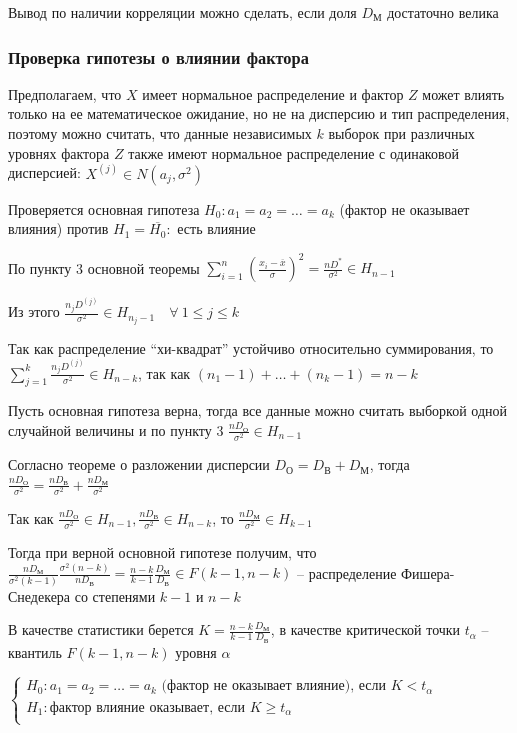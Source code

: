 Вывод по наличии корреляции можно сделать, если доля $D_\text{М}$ достаточно велика

\hypertarget{factor_influence_hypothesis}{}

\subsubsection{Проверка гипотезы о влиянии фактора}

Предполагаем, что $X$ имеет нормальное распределение и фактор $Z$ может влиять только на ее математическое ожидание, 
но не на дисперсию и тип распределения, поэтому можно считать, что данные независимых $k$ выборок при различных уровнях фактора $Z$
также имеют нормальное распределение с одинаковой дисперсией: $X^{(j)} \in N(a_j, \sigma^2)$

Проверяется основная гипотеза $H_0 : a_1 = a_2 = \dots = a_k$ (фактор не оказывает влияния) против $H_1 = \overline{H_0} : $ есть влияние

По пункту 3 основной теоремы $\sum_{i = 1}^n \left(\frac{x_i - \overline{x}}{\sigma}\right)^2 = \frac{n D^*}{\sigma^2} \in H_{n - 1}$

Из этого $\frac{n_j D^{(j)}}{\sigma^2} \in H_{n_j - 1} \quad \forall \ 1 \leq j \leq k$

Так как распределение \enquote{хи-квадрат} устойчиво относительно суммирования, то $\sum_{j = 1}^k \frac{n_j D^{(j)}}{\sigma^2} \in H_{n - k}$, так как
$(n_1 - 1) + \dots + (n_k - 1) = n - k$

Пусть основная гипотеза верна, тогда все данные можно считать выборкой одной случайной величины и по пункту 3 $\frac{n D_{\text{О}}}{\sigma^2} \in H_{n - 1}$

Согласно теореме о разложении дисперсии $D_\text{О} = D_\text{В} + D_\text{М}$, тогда $\frac{n D_{\text{О}}}{\sigma^2} = \frac{n D_{\text{В}}}{\sigma^2} + \frac{n D_{\text{М}}}{\sigma^2}$

Так как $\frac{n D_{\text{О}}}{\sigma^2} \in H_{n - 1}, \frac{n D_{\text{В}}}{\sigma^2} \in H_{n - k}$, то $\frac{n D_{\text{М}}}{\sigma^2} \in H_{k - 1}$

Тогда при верной основной гипотезе получим, что $\frac{n D_{\text{М}}}{\sigma^2 (k - 1)} \frac{\sigma^2 (n - k)}{n D_\text{В}} = \frac{n - k}{k - 1} \frac{D_\text{М}}{D_\text{В}} \in F(k - 1, n - k)$ --
распределение Фишера-Снедекера со степенями $k - 1$ и $n - k$

В качестве статистики берется $K = \frac{n - k}{k - 1} \frac{D_\text{М}}{D_\text{В}}$, в качестве критической точки $t_\alpha$ -- квантиль $F(k - 1, n - k)$ уровня $\alpha$

$\begin{cases}
    H_0 : a_1 = a_2 = \dots = a_k \text{ (фактор не оказывает влияние), если } K < t_\alpha \\
    H_1 : \text{фактор влияние оказывает, если } K \geq t_\alpha \\
\end{cases}$
